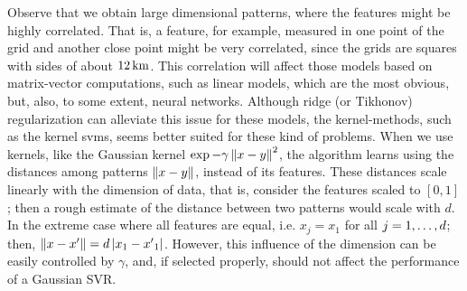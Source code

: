 %
Observe that we obtain large dimensional patterns, where the features might be highly correlated. That is, a feature,  for example, measured in one point of the grid and another close point might be very correlated, since the grids are squares with sides of about $\SI{12}{\kilo\metre}$.
This correlation will affect those models based on matrix-vector computations, such as linear models, which are the most obvious, but, also, to some extent, neural networks.
Although ridge (or Tikhonov) regularization can alleviate this issue for these models, the kernel-methods, such as the kernel \acrshort{svm}s, seems better suited for these kind of problems.
When we use kernels, like the Gaussian kernel $\exp{-\gamma \left\lVert x-y\right\rVert^2}$, the algorithm learns using the distances among patterns $\left\lVert x - y\right\rVert$, instead of its features.
%
These distances scale linearly with the dimension of data, that is, consider the features scaled to $[0, 1]$; then a rough estimate of the distance between two patterns would scale with $d$. In the extreme case where all features are equal, i.e. $x_j = x_1$ for all $j=1, \ldots, d$; then, $\left\lVert x - x'\right\rVert = d \left|x_1 - {x'}_1\right| $.
However, this influence of the dimension can be easily controlled by $\gamma$, and, if selected properly, should not affect the performance of a Gaussian SVR.


